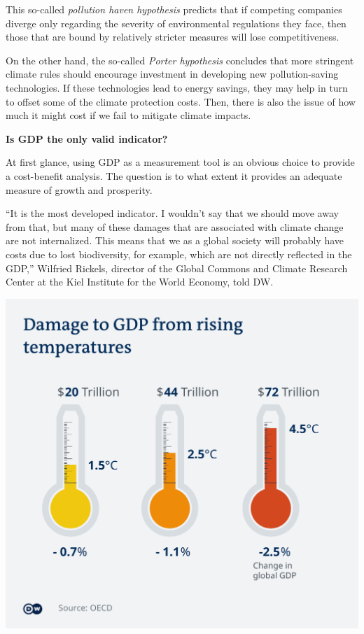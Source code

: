\documentclass[
]{book}
\begin{document}
This so-called \emph{pollution haven hypothesis} predicts that if competing companies diverge only regarding the severity of environmental regulations they face, then those that are bound by relatively stricter
measures will lose competitiveness.

On the other hand, the so-called \emph{Porter hypothesis} concludes that more stringent climate rules should encourage investment in developing new pollution-saving technologies. If these technologies lead to energy savings, they may help in turn to offset some of the climate protection costs. Then, there is also the issue of how much it might cost if we fail to mitigate climate impacts.

\textbf{Is GDP the only valid indicator?}

At first glance, using GDP as a measurement tool is an obvious choice to provide a cost-benefit analysis. The question is to what extent it provides an adequate measure of growth and prosperity.

``It is the most developed indicator. I wouldn't say that we should move away from that, but many of these damages that are associated with climate change are not internalized. This means that we as a global society will probably have costs due to lost biodiversity, for example, which are not directly reflected in the GDP,'' Wilfried Rickels, director of the Global Commons and Climate Research Center at the Kiel Institute for the World Economy, told DW.

\includegraphics{fig/OECD_GDP_damage_from_temperature.png}
\end{document}
